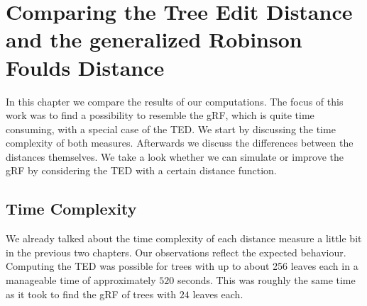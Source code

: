 \chapter{Comparing the Tree Edit Distance and the generalized Robinson Foulds Distance}
In this chapter we compare the results of our computations. The focus of this work was to find a possibility to resemble the gRF, which is quite time consuming, with a special case of the TED. We start by discussing the time complexity of both measures. Afterwards we discuss the differences between the distances themselves. We take a look whether we can simulate or improve the gRF by considering the TED with a certain distance function.

\section{Time Complexity}
We already talked about the time complexity of each distance measure a little bit in the previous two chapters. Our observations reflect the expected behaviour. Computing the TED was possible for trees with up to about 256 leaves each in a manageable time of approximately $520$ seconds. This was roughly the same time as it took to find the gRF of trees with $24$ leaves each. 